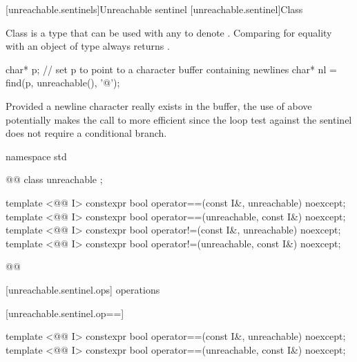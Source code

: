 [unreachable.sentinels]{Unreachable sentinel}
[unreachable.sentinel]{Class }


\pnum
{}%
Class  is a  type that can be
used with any  to
denote .
Comparing  for equality with an object of type
 always returns .

\enterexample
\begin{codeblock}
char* p;
// set p to point to a character buffer containing newlines
char* nl = find(p, unreachable(), '@\textbackslash@n');
\end{codeblock}

Provided a newline character really exists in the buffer, the use of
 above potentially makes the call to  more
efficient since the loop test against the sentinel does not require a
conditional branch.
\exitexample

\begin{codeblock}
namespace std { @@
  class unreachable { };

  template <@@ I>
    constexpr bool operator==(const I&, unreachable) noexcept;
  template <@@ I>
    constexpr bool operator==(unreachable, const I&) noexcept;
  template <@@ I>
    constexpr bool operator!=(const I&, unreachable) noexcept;
  template <@@ I>
    constexpr bool operator!=(unreachable, const I&) noexcept;
}@\removed{\}}@
\end{codeblock}

[unreachable.sentinel.ops]{ operations}

[unreachable.sentinel.op==]{}

%
%
\begin{itemdecl}
template <@@ I>
  constexpr bool operator==(const I&, unreachable) noexcept;
template <@@ I>
  constexpr bool operator==(unreachable, const I&) noexcept;
\end{itemdecl}


